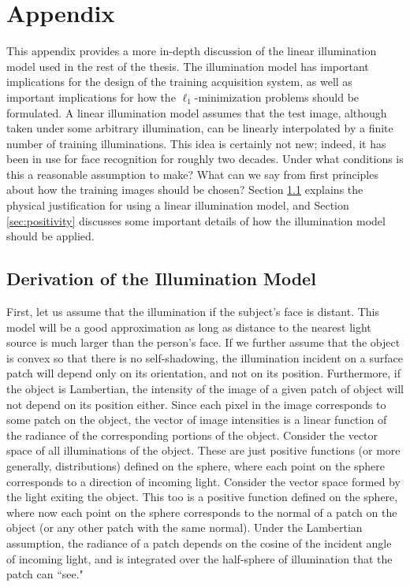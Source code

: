 \chapter{Appendix}
\label{chap:appendix_illumination}

This appendix provides a more in-depth discussion of the linear illumination
model used in the rest of the thesis.  The illumination model has important
implications for the design of the training acquisition system, as well
as important implications for how the $\ell_1$-minimization problems should
be formulated.
A linear illumination model assumes that the test image, although taken under some
arbitrary illumination, can be linearly interpolated by a finite number of
training illuminations.  This idea is certainly not new; indeed, it has been in
use for face recognition for roughly two decades\cite{Turk1991-CVPR}.  Under
what conditions is this a reasonable assumption to make?  What can we say from
first principles about how the training images should be chosen?  
Section \ref{sec:illumination_derivation} explains the physical justification
for using a linear illumination model, and Section \ref{sec:positivity}
discusses some important details of how the illumination model should be 
applied.

\section{Derivation of the Illumination Model}
\label{sec:illumination_derivation}
%
First, let us assume that the illumination if the subject's face is distant.
This model will be a good approximation as long as distance to the nearest
light source is much larger than the person's face.  If we further assume that
the object is convex so that there is no self-shadowing, the illumination
incident on a surface patch will depend only on its orientation, and not on its
position.  Furthermore, if the object is Lambertian, the intensity of the image
of a given patch of object will not depend on its position either.  Since each
pixel in the image corresponds to some patch on the object, the vector of image
intensities is a linear function of the radiance of the corresponding portions
of the object.  Consider the vector space of all illuminations of the object.
These are just positive functions (or more generally, distributions) defined on
the sphere, where each point on the sphere corresponds to a direction of
incoming light.  Consider the vector space formed by the light exiting the
object.  This too is a positive function defined on the sphere, where now each
point on the sphere corresponds to the normal of a patch on the object (or any
other patch with the same normal).  Under the Lambertian assumption, the
radiance of a patch depends on the cosine of the incident angle of incoming
light, and is integrated over the half-sphere of illumination that the patch
can ``see."

